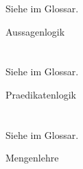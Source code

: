 Siehe  im Glossar.

\glsdesc{Aussagenlogik}

\section[Prädikatenlogik]{\Praedikatenlogik}%
\beginsection            {\Praedikatenlogik}
\label                {sec-Praedikatenlogik}


Siehe  im Glossar.

\glsdesc{Praedikatenlogik}

\section[Mengenlehre]{\Mengenlehre}%
\beginsection        {\Mengenlehre}
\label            {sec-Mengenlehre}


Siehe  im Glossar.

\glsdesc{Mengenlehre}

\Endchapter
\color{black}%
